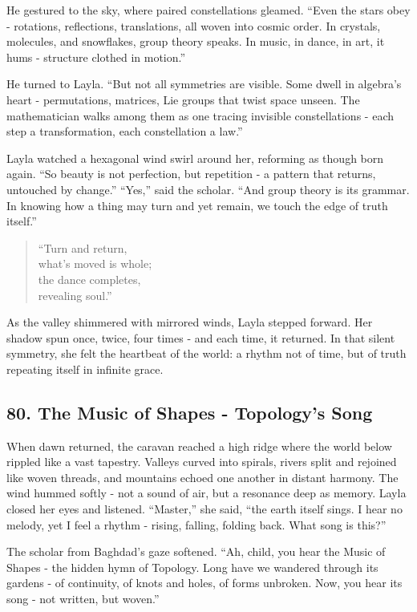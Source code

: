 \documentclass[
  letterpaper,
  DIV=11,
  numbers=noendperiod]{scrreprt}
\begin{document}
He gestured to the sky, where paired constellations gleamed. ``Even the
stars obey - rotations, reflections, translations, all woven into cosmic
order. In crystals, molecules, and snowflakes, group theory speaks. In
music, in dance, in art, it hums - structure clothed in motion.''

He turned to Layla. ``But not all symmetries are visible. Some dwell in
algebra's heart - permutations, matrices, Lie groups that twist space
unseen. The mathematician walks among them as one tracing invisible
constellations - each step a transformation, each constellation a law.''

Layla watched a hexagonal wind swirl around her, reforming as though
born again. ``So beauty is not perfection, but repetition - a pattern
that returns, untouched by change.'' ``Yes,'' said the scholar. ``And
group theory is its grammar. In knowing how a thing may turn and yet
remain, we touch the edge of truth itself.''

\begin{quote}
``Turn and return,\\
what's moved is whole;\\
the dance completes,\\
revealing soul.''
\end{quote}

As the valley shimmered with mirrored winds, Layla stepped forward. Her
shadow spun once, twice, four times - and each time, it returned. In
that silent symmetry, she felt the heartbeat of the world: a rhythm not
of time, but of truth repeating itself in infinite grace.

\subsection{80. The Music of Shapes - Topology's
Song}\label{the-music-of-shapes---topologys-song}

When dawn returned, the caravan reached a high ridge where the world
below rippled like a vast tapestry. Valleys curved into spirals, rivers
split and rejoined like woven threads, and mountains echoed one another
in distant harmony. The wind hummed softly - not a sound of air, but a
resonance deep as memory. Layla closed her eyes and listened.
``Master,'' she said, ``the earth itself sings. I hear no melody, yet I
feel a rhythm - rising, falling, folding back. What song is this?''

The scholar from Baghdad's gaze softened. ``Ah, child, you hear the
Music of Shapes - the hidden hymn of Topology. Long have we wandered
through its gardens - of continuity, of knots and holes, of forms
unbroken. Now, you hear its song - not written, but woven.''
\end{document}
